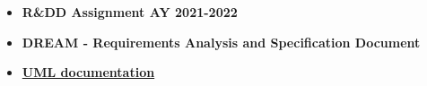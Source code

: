 \documentclass[../../main.tex]{subfiles}
\begin{document}
\begin{itemize}
  \item \textbf{R\&DD Assignment AY 2021-2022}
  \item \textbf{DREAM  -  Requirements  Analysis  and  Specification  Document}
  \item \textbf{\href{https://www.uml-diagrams.org/}{UML documentation}}

\end{itemize}
\end{document}

